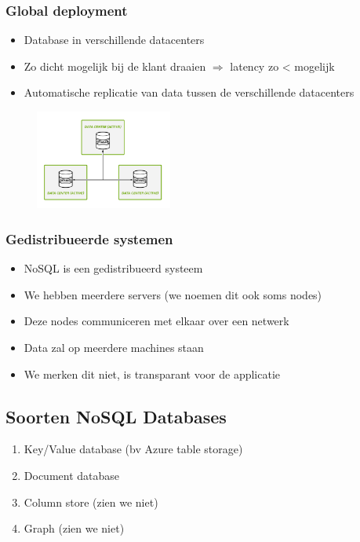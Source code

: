 \documentclass{article}
\begin{document}
\subsubsection{Global deployment}

\begin{itemize}
    \item Database in verschillende datacenters
    \item Zo dicht mogelijk bij de klant draaien $\Rightarrow$ latency zo < mogelijk
    \item Automatische replicatie van data tussen de verschillende datacenters
\end{itemize}

\begin{figure}[H]
    \centering
    \includegraphics[width=0.4\textwidth]{global-deployment.png}
    \caption{}
\end{figure}

\subsubsection{Gedistribueerde systemen}

\begin{itemize}
    \item NoSQL is een gedistribueerd systeem
    \item We hebben meerdere servers (we noemen dit ook soms nodes)
    \item Deze nodes communiceren met elkaar over een netwerk
    \item Data zal op meerdere machines staan
    \item We merken dit niet, is transparant voor de applicatie
\end{itemize}

\subsection{Soorten NoSQL Databases}

\begin{enumerate}
    \item Key/Value database (bv Azure table storage)
    \item Document database
    \item Column store (zien we niet)
    \item Graph (zien we niet)
\end{enumerate}
\end{document}
